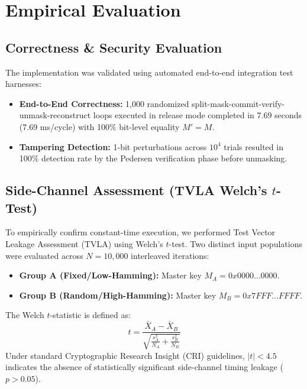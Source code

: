 \documentclass[10pt,journal,compsoc]{IEEEtran}
\begin{document}
\section{Empirical Evaluation}

\subsection{Correctness \& Security Evaluation}
The implementation was validated using automated end-to-end integration test harnesses:
\begin{itemize}
    \item \textbf{End-to-End Correctness:} 1,000 randomized split-mask-commit-verify-unmask-reconstruct loops executed in release mode completed in 7.69 seconds (7.69 ms/cycle) with 100\% bit-level equality $M' = M$.
    \item \textbf{Tampering Detection:} 1-bit perturbations across $10^4$ trials resulted in 100\% detection rate by the Pedersen verification phase before unmasking.
\end{itemize}

\subsection{Side-Channel Assessment (TVLA Welch's $t$-Test)}
To empirically confirm constant-time execution, we performed Test Vector Leakage Assessment (TVLA) using Welch's $t$-test. Two distinct input populations were evaluated across $N = 10,000$ interleaved iterations:
\begin{itemize}
    \item \textbf{Group A (Fixed/Low-Hamming):} Master key $M_A = 0x0000\dots0000$.
    \item \textbf{Group B (Random/High-Hamming):} Master key $M_B = 0x7FFF\dots FFFF$.
\end{itemize}

The Welch $t$-statistic is defined as:
\begin{equation}
t = \frac{\bar{X}_A - \bar{X}_B}{\sqrt{\frac{s_A^2}{N_A} + \frac{s_B^2}{N_B}}}
\end{equation}
Under standard Cryptographic Research Insight (CRI) guidelines, $|t| < 4.5$ indicates the absence of statistically significant side-channel timing leakage ($p > 0.05$).
\end{document}
